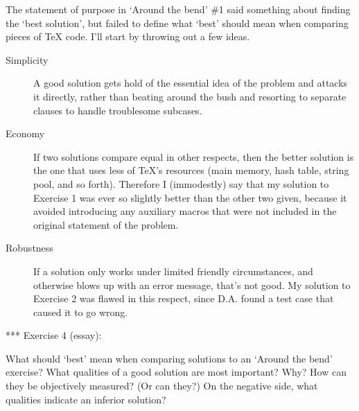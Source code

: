 
The statement of purpose in `Around the bend' \#1 said something about
finding the `best solution', but failed to define what `best' should
mean when comparing pieces of TeX code. I'll start by throwing out
a few ideas.

\begin{description}
\item[Simplicity] A good solution gets hold of the essential idea of the
problem and attacks it directly, rather than beating around the bush
and resorting to separate clauses to handle troublesome subcases.

\item[Economy] If two solutions compare equal in other respects, then the
better solution is the one that uses less of TeX's resources (main
memory, hash table, string pool, and so forth). Therefore I
(immodestly) say that my solution to Exercise 1 was ever so slightly
better than the other two given, because it avoided introducing any
auxiliary macros that were not included in the original statement of
the problem.

\item[Robustness] If a solution only works under limited friendly
circumstances, and otherwise blows up with an error message, that's not
good. My solution to Exercise 2 was flawed in this respect, since D.A.
found a test case that caused it to go wrong.
\end{description}

*** Exercise 4 (essay):

What should `best' mean when comparing solutions to an `Around the
bend' exercise? What qualities of a good solution are most important?
Why? How can they be objectively measured? (Or can they?) On the
negative side, what qualities indicate an inferior solution?


\begin{comment}

[Exercise 5 moved to exercise.005]
[Exercise 6 moved to exercise.006]
[Exercise 7 moved to exercise.007]

Send answers to:

Michael Downes      mjd@math.ams.com (Internet)

A summary will be posted Tuesday, December 4, 1991. However, because of
the difficulty of E7, I will probably procrastinate on posting the
solutions for that exercise until the first or second week of December.
\end{comment}

